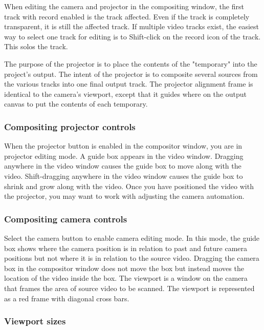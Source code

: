When editing the camera and projector in the compositing window, the first track with record enabled is the track affected. 
Even if the track is completely transparent, it is still the affected track. 
If multiple video tracks exist, the easiest way to select one track for editing is to Shift-click on the record icon of the track. 
This solos the track.

The purpose of the projector is to place the contents of the "temporary" into the project's output. 
The intent of the projector is to composite several sources from the various tracks into one final output track. 
The projector alignment frame is identical to the camera's viewport, except that it guides where on the output canvas to put the contents of each temporary.

\subsubsection*{Compositing projector controls}%
\label{ssub:compositing_projector_controls}

When the projector button is enabled in the compositor window, you are in projector editing mode. 
A guide box appears in the video window. 
Dragging anywhere in the video window causes the guide box to move along with the video. 
Shift-dragging anywhere in the video window causes the guide box to shrink and grow along with the video. Once you have positioned the video with the projector, you may want to work with adjusting the camera automation.

\subsubsection*{Compositing camera controls}%
\label{ssub:compositing_camera_controls}

Select the camera button to enable camera editing mode. 
In this mode, the guide box shows where the camera position is in relation to past and future camera positions but not where it is in relation to the source video. 
Dragging the camera box in the compositor window does not move the box but instead moves the location of the video inside the box. 
The viewport is a window on the camera that frames the area of source video to be scanned. 
The viewport is represented as a red frame with diagonal cross bars.

\subsubsection*{Viewport sizes}%
\label{ssub:viewport_sizes}

